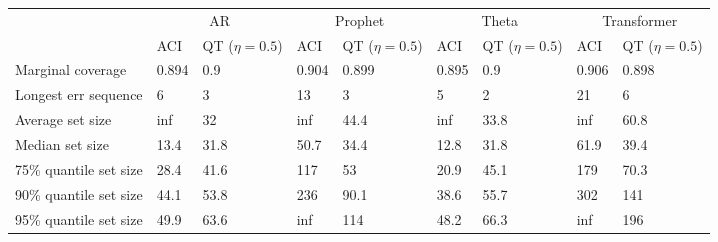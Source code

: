 \begin{tabular}{lllllllll}
\toprule
& \multicolumn{2}{c}{AR}& \multicolumn{2}{c}{Prophet}& \multicolumn{2}{c}{Theta}& \multicolumn{2}{c}{Transformer} \\
& ACI & QT ($\eta=0.5$) & ACI & QT ($\eta=0.5$) & ACI & QT ($\eta=0.5$) & ACI & QT ($\eta=0.5$) \\
\midrule
Marginal coverage & 0.894 & 0.9 & 0.904 & 0.899 & 0.895 & 0.9 & 0.906 & 0.898 \\
Longest err sequence & 6 & 3 & 13 & 3 & 5 & 2 & 21 & 6 \\
Average set size & inf & 32 & inf & 44.4 & inf & 33.8 & inf & 60.8 \\
Median set size & 13.4 & 31.8 & 50.7 & 34.4 & 12.8 & 31.8 & 61.9 & 39.4 \\
75\% quantile set size & 28.4 & 41.6 & 117 & 53 & 20.9 & 45.1 & 179 & 70.3 \\
90\% quantile set size & 44.1 & 53.8 & 236 & 90.1 & 38.6 & 55.7 & 302 & 141 \\
95\% quantile set size & 49.9 & 63.6 & inf & 114 & 48.2 & 66.3 & inf & 196 \\
\bottomrule
\end{tabular}
